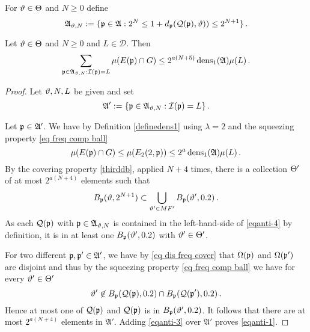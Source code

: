 For $\vartheta \in \Theta$ and $N\ge 0$ define
\begin{equation}\label{eqantidefap}
    \mathfrak{A}_{\vartheta,N}:=\{\mathfrak p\in\mathfrak{A}: 2^{N}\le 1+d_{\mathfrak p}(\mathcal{Q}(\mathfrak p), \vartheta))\le 2^{N+1}\} \, .
\end{equation}


\begin{lemma}\label{lem samel}
Let $\vartheta \in \Theta$ and $N\ge 0$ and
$L\in \mathcal{D}$. Then
\begin{equation}\label{eqanti-1}
    \sum_{\mathfrak p\in\mathfrak{A}_{\vartheta,N}:\mathcal{I}(\mathfrak p)=L}\mu(E(\mathfrak p)\cap G)\le  2^{a(N+5)}\operatorname{\operatorname{dens}}_1(\mathfrak{A})\mu(L)\, .
\end{equation}
\end{lemma}
\begin{proof}
Let $\vartheta,N,L$ be given and set
\begin{equation}
\mathfrak{A}':=\{\mathfrak p\in\mathfrak{A}_{\vartheta,N}:\mathcal{I}(\mathfrak p)=L\}\, .
\end{equation}



Let
$\mathfrak p\in\mathfrak{A}'$.
We have
by Definition \eqref{definedens1}
using $\lambda=2$ and the squeezing property \eqref{eq freq comp ball}
\begin{equation}\label{eqanti-3}
\mu(E(\mathfrak p)\cap G)\le \mu(E_2(2, \mathfrak p))\le 2^{a}\operatorname{\operatorname{dens}}_1(\mathfrak{A})\mu(L)\, .
\end{equation}
By the covering property \eqref{thirddb}, applied $N+4$ times, there is a collection $\Theta'$ of at most $2^{a(N+4)}$
elements such that
\begin{equation}\label{eqanti-4}
    B_{\mathfrak p}(\vartheta, 2^{N+1})\subset \bigcup_{\vartheta'\in MF'}
    B_{\mathfrak p}(\vartheta', 0.2)\, .
\end{equation}
As each $\mathcal{Q}(\mathfrak p)$ with $\mathfrak p\in \mathfrak{A}_{\vartheta,N}$
is contained in the left-hand-side
of \eqref{eqanti-4}
by definition, it is in  at least one $B_{\mathfrak p}(\vartheta', 0.2)$
with $\vartheta'\in \Theta'$.


For two different $\mathfrak p,\mathfrak p'\in \mathfrak{A}'$, we have by
\eqref{eq dis freq cover} that
$\Omega(\mathfrak p)$ and $\Omega(\mathfrak p')$ are disjoint and thus by the squeezing property \eqref{eq freq comp ball} we have for every $\vartheta'\in \Theta'$
\begin{equation}
    \vartheta'\not\in B_{\mathfrak p}(\mathcal{Q}(\mathfrak p), 0.2)\cap
B_{\mathfrak p}(\mathcal{Q}(\mathfrak p'), 0.2)\, .
\end{equation}
Hence at most one of $\mathcal{Q}(\mathfrak p)$
and $\mathcal{Q}(\mathfrak p)$ is in
$B_{\mathfrak p}(\vartheta', 0.2)$.
It follows that there are at most $2^{a(N+4)}$ elements in
$\mathfrak{A}'$. Adding \eqref{eqanti-3} over $\mathfrak{A}'$ proves
\eqref{eqanti-1}.


\end{proof}


